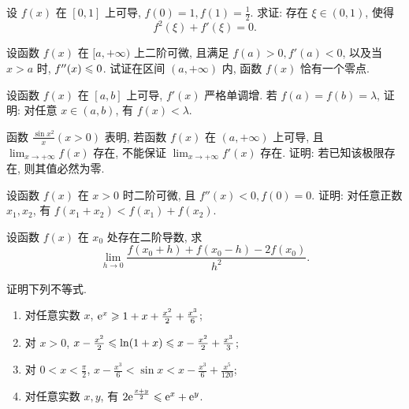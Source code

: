 \begin{exercise}[3.C.8]
    设 $f(x)$ 在 $[0, 1]$ 上可导, $f(0) = 1, f(1) = \frac{1}{2}$. 求证: 存在 $\xi \in (0, 1)$, 使得
    $$f^2(\xi) + f'(\xi) = 0.$$
\end{exercise}

\begin{exercise}[3.C.9]
    设函数 $f(x)$ 在 $[a, +\infty)$ 上二阶可微, 且满足 $f(a) > 0, f'(a) < 0$, 以及当 $x > a$ 时, $f''(x) \leqslant 0$. 试证在区间 $(a, +\infty)$ 内, 函数 $f(x)$ 恰有一个零点.
\end{exercise}

\begin{exercise}[3.C.10]
    设函数 $f(x)$ 在 $[a, b]$ 上可导, $f'(x)$ 严格单调增. 若 $f(a) = f(b) = \lambda$, 证明: 对任意 $x \in (a, b)$, 有 $f(x) < \lambda$.
\end{exercise}

\begin{exercise}[3.C.11]
    函数 $\frac{\sin x^2}{x} (x > 0)$ 表明, 若函数 $f(x)$ 在 $(a, +\infty)$ 上可导, 且 $\lim_{x \to +\infty} f(x)$ 存在, 不能保证 $\lim_{x \to +\infty} f'(x)$ 存在. 证明: 若已知该极限存在, 则其值必然为零.
\end{exercise}

\begin{exercise}[3.C.12]
    设函数 $f(x)$ 在 $x > 0$ 时二阶可微, 且 $f''(x) < 0, f(0) = 0$. 证明: 对任意正数 $x_1, x_2$, 有 $f(x_1 + x_2) < f(x_1) + f(x_2)$.
\end{exercise}

\begin{exercise}[3.C.13]
    设函数 $f(x)$ 在 $x_0$ 处存在二阶导数, 求
    $$\lim_{h \to 0} \frac{f(x_0 + h) + f(x_0 - h) - 2f(x_0)}{h^2}.$$
\end{exercise}

\begin{exercise}[3.C.14]
    证明下列不等式.
    \begin{enumerate}
        \item 对任意实数 $x$, $\mathrm{e}^x \geqslant 1 + x + \frac{x^2}{2} + \frac{x^3}{6}$;
        \item 对 $x > 0$, $x - \frac{x^2}{2} \leqslant \ln(1 + x) \leqslant x - \frac{x^2}{2} + \frac{x^3}{3}$;
        \item 对 $0 < x < \frac{\pi}{2}$, $x - \frac{x^3}{6} < \sin x < x - \frac{x^3}{6} + \frac{x^5}{120}$;
        \item 对任意实数 $x, y$, 有 $2 \mathrm{e}^{\frac{x+y}{2}} \leqslant \mathrm{e}^x + \mathrm{e}^y$.
    \end{enumerate}
\end{exercise}

